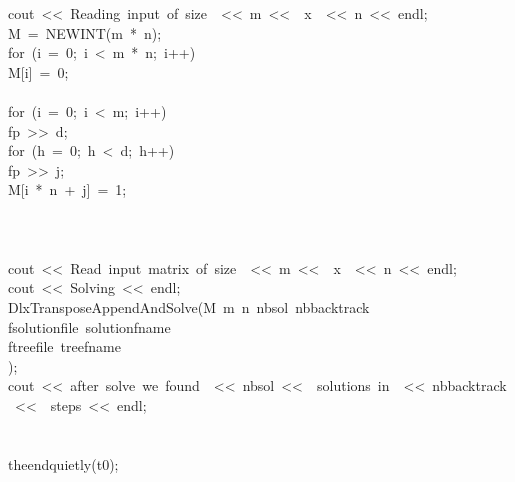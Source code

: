 \begin{tabbing}
\>\>cout\ <<\ Reading\ input\ of\ size\ \ <<\ m\ <<\ \ x\ \ <<\ n\ <<\ endl;\\[0pt]
\>\>M\ =\ NEWINT(m\ *\ n);\\[0pt]
\>\>for\ (i\ =\ 0;\ i\ <\ m\ *\ n;\ i++)\ \\[0pt]
\>\>\>M[i]\ =\ 0;\\[0pt]
\>\>\>\\[0pt]
\>\>for\ (i\ =\ 0;\ i\ <\ m;\ i++)\ \\[0pt]
\>\>\>fp\ >>\ d;\\[0pt]
\>\>\>for\ (h\ =\ 0;\ h\ <\ d;\ h++)\ \\[0pt]
\>\>\>\>fp\ >>\ j;\\[0pt]
\>\>\>\>M[i\ *\ n\ +\ j]\ =\ 1;\\[0pt]
\>\>\>\>\\[0pt]
\>\>\>\\[0pt]
\>\\[0pt]
\>cout\ <<\ Read\ input\ matrix\ of\ size\ \ <<\ m\ <<\ \ x\ \ <<\ n\ <<\ endl;\\[0pt]
\>cout\ <<\ Solving\ <<\ endl;\\[0pt]
\>DlxTransposeAppendAndSolve(M\ m\ n\ nbsol\ nbbacktrack\ \\[0pt]
\>\>fsolutionfile\ solutionfname\ \\[0pt]
\>\>ftreefile\ treefname\ \\[0pt]
\>);\\[0pt]
\>cout\ <<\ after\ solve\ we\ found\ \ <<\ nbsol\ <<\ \ solutions\ in\ \ <<\ nbbacktrack\ <<\ \ steps\ <<\ endl;\\[0pt]
\\[0pt]
\\[0pt]
\>theendquietly(t0);\\[0pt]
\\[0pt]
\\[0pt]
\>\\[0pt]
\\[0pt]
\end{tabbing}
